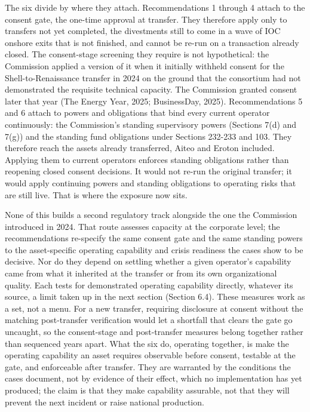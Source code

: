 \documentclass[twoside,fontset=lmodern]{mitthesis}
\begin{document}
The six divide by where they attach. Recommendations 1 through 4 attach
to the consent gate, the one-time approval at transfer. They therefore
apply only to transfers not yet completed, the divestments still to come
in a wave of IOC onshore exits that is not finished, and cannot be
re-run on a transaction already closed. The consent-stage screening they
require is not hypothetical: the Commission applied a version of it when
it initially withheld consent for the Shell-to-Renaissance transfer in
2024 on the ground that the consortium had not demonstrated the
requisite technical capacity. The Commission granted consent later that
year (The Energy Year, 2025; BusinessDay, 2025). Recommendations 5 and 6
attach to powers and obligations that bind every current operator
continuously: the Commission's standing supervisory powers (Sections
7(d) and 7(g)) and the standing fund obligations under Sections 232-233
and 103. They therefore reach the assets already transferred, Aiteo and
Eroton included. Applying them to current operators enforces standing
obligations rather than reopening closed consent decisions. It would not
re-run the original transfer; it would apply continuing powers and
standing obligations to operating risks that are still live. That is
where the exposure now sits.

None of this builds a second regulatory track alongside the one the
Commission introduced in 2024. That route assesses capacity at the
corporate level; the recommendations re-specify the same consent gate
and the same standing powers to the asset-specific operating capability
and crisis readiness the cases show to be decisive. Nor do they depend
on settling whether a given operator's capability came from what it
inherited at the transfer or from its own organizational quality. Each
tests for demonstrated operating capability directly, whatever its
source, a limit taken up in the next section (Section 6.4). These
measures work as a set, not a menu. For a new transfer, requiring
disclosure at consent without the matching post-transfer verification
would let a shortfall that clears the gate go uncaught, so the
consent-stage and post-transfer measures belong together rather than
sequenced years apart. What the six do, operating together, is make the
operating capability an asset requires observable before consent,
testable at the gate, and enforceable after transfer. They are warranted
by the conditions the cases document, not by evidence of their effect,
which no implementation has yet produced; the claim is that they make
capability assurable, not that they will prevent the next incident or
raise national production.
\end{document}
